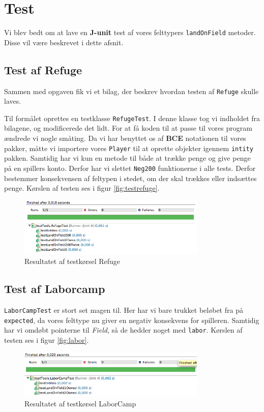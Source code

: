 \section{Test}
Vi blev bedt om at lave en \textbf{J-unit} test af vores felttypers \texttt{landOnField} metoder. Disse vil være beskrevet i dette afsnit.
\subsection{Test af Refuge}
Sammen med opgaven fik vi et bilag, der beskrev hvordan testen af \texttt{Refuge} skulle laves.


Til formålet oprettes en testklasse \texttt{RefugeTest}. I denne klasse tog vi indholdet fra bilagene, og modificerede det lidt. For at få koden til at passe til vores program ændrede vi nogle småting. Da vi har benyttet os af \textbf{BCE} notationen til vores pakker, måtte vi importere vores \texttt{Player} til at oprette objekter igennem \texttt{intity} pakken. Samtidig har vi kun en metode til både at trække penge og give penge på en spillers konto. Derfor har vi slettet \texttt{Neg200} funktionerne i  alle tests. Derfor bestemmer konsekvensen af feltypen i stedet, om der skal trækkes eller indsættes penge. Kørslen af testen ses i figur \vref{fig:testrefuge}.
\begin{figure}[!ht]
\centering
\includegraphics[width=0.8\textwidth]{RefugeTest.jpg}
\caption[<Text for the list of figures>]{Resultatet af testkørsel Refuge}
\label{fig:testrefuge} 
\end{figure}
\subsection{Test af Laborcamp}
\texttt{LaborCampTest} er stort set magen til. Her har vi bare trukket beløbet fra på \texttt{expected}, da vores felttype nu giver en negativ konsekvens for spilleren. Samtidig har vi omdøbt pointerne til \textit{Field}, så de hedder noget med \texttt{labor}. Kørslen af testen ses i figur \vref{fig:labor}.
\begin{figure}[!ht]
\centering
\includegraphics[width=0.8\textwidth]{LaborTest.jpg}
\caption[<Text for the list of figures>]{Resultatet af testkørsel LaborCamp}
\label{fig:labor} 
\end{figure}
